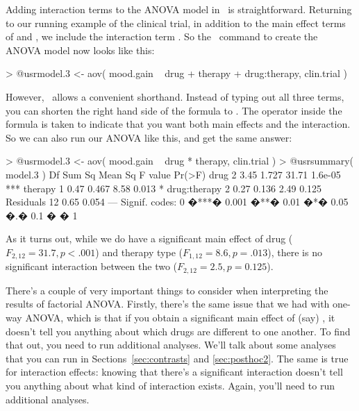 Adding interaction terms to the ANOVA model in \R\ is straightforward. Returning to our running example of the clinical trial, in addition to the main effect terms of  and , we include the interaction term . So the \R\ command to create the ANOVA model now looks like this:
\begin{rblock1}
> @usr{model.3 <- aov( mood.gain ~ drug + therapy + drug:therapy, clin.trial )}
\end{rblock1}
However, \R\ allows a convenient shorthand. Instead of typing out all three terms, you can shorten the right hand side of the formula to . The \rtext{*} operator inside the formula is taken to indicate that you want both main effects and the interaction. So we can also run our ANOVA like this, and get the same answer:
\begin{rblock1}
> @usr{model.3 <- aov( mood.gain ~ drug * therapy, clin.trial )}
> @usr{summary( model.3 )}
             Df Sum Sq Mean Sq F value  Pr(>F)    
drug          2   3.45   1.727   31.71 1.6e-05 ***
therapy       1   0.47   0.467    8.58   0.013 *  
drug:therapy  2   0.27   0.136    2.49   0.125    
Residuals    12   0.65   0.054                      
---
Signif. codes:  0 �***� 0.001 �**� 0.01 �*� 0.05 �.� 0.1 � � 1 
\end{rblock1}
As it turns out, while we do have a significant main effect of drug ($F_{2,12} = 31.7, p <.001$) and therapy type ($F_{1,12} = 8.6, p=.013$), there is no significant interaction between the two ($F_{2,12} = 2.5, p = 0.125$).


There's a couple of very important things to consider when interpreting the results of factorial ANOVA. Firstly, there's the same issue that we had with one-way ANOVA, which is that if you obtain a significant main effect of (say) , it doesn't tell you anything about which drugs are different to one another. To find that out, you need to run additional analyses. We'll talk about some analyses that you can run in Sections~\ref{sec:contrasts} and \ref{sec:posthoc2}. The same is true for interaction effects: knowing that there's a significant interaction doesn't tell you anything about what kind of interaction exists. Again, you'll need to run additional analyses. 

